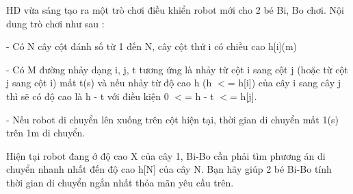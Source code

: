 HD vừa sáng tạo ra một trò chơi điều khiển robot mới cho 2 bé Bi, Bo chơi. Nội dung trò chơi như sau :

- Có N cây cột đánh số từ 1 đến N, cây cột thứ i có chiều cao h[i](m)

- Có M đường nhảy dạng i, j, t tương ứng là nhảy từ cột i sang cột j (hoặc từ cột j sang cột i) mất t(s) và nếu nhảy từ độ cao h (h $<$= h[i]) của cây i sang cây j thì sẽ có độ cao là h - t với điều kiện 0 $<$= h - t $<$= h[j].

- Nếu robot di chuyển lên xuống trên cột hiện tại, thời gian di chuyển mất 1(s) trên 1m di chuyển.

Hiện tại robot đang ở độ cao X của cây 1, Bi-Bo cần phải tìm phương án di chuyển nhanh nhất đến độ cao h[N] của cây N. Bạn hãy giúp 2 bé Bi-Bo tính thời gian di chuyển ngắn nhất thỏa mãn yêu cầu trên.